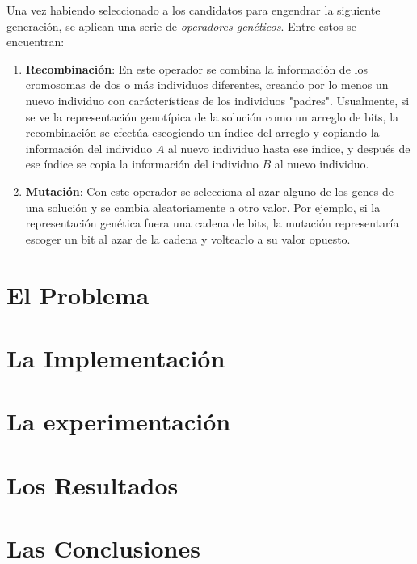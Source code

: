 \documentclass{article}
\begin{document}
  Una vez habiendo seleccionado a los candidatos para engendrar la siguiente generación, se aplican una serie de 
  \textit{operadores genéticos}. Entre estos se encuentran: 
  \begin{enumerate}
    \item \textbf{Recombinación}: En este operador se combina la información de los cromosomas de dos o más
      individuos diferentes, creando por lo menos un nuevo individuo con carácterísticas de los individuos "padres".
      Usualmente, si se ve la representación genotípica de la solución como un arreglo de bits, la recombinación
      se efectúa escogiendo un índice del arreglo y copiando la información del individuo $A$ al nuevo individuo
      hasta ese índice, y después de ese índice se copia la información del individuo $B$ al nuevo individuo.

    \item \textbf{Mutación}: Con este operador se selecciona al azar alguno de los genes de una solución y se cambia
      aleatoriamente a otro valor. Por ejemplo, si la representación genética fuera una cadena de bits, la mutación
      representaría escoger un bit al azar de la cadena y voltearlo a su valor opuesto.
  \end{enumerate}


\section{El Problema}
\section{La Implementación}
\section{La experimentación}
\section{Los Resultados}
\section{Las Conclusiones}
\end{document}
